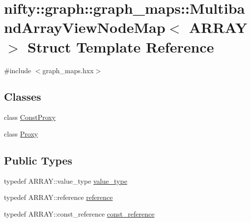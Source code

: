 \hypertarget{structnifty_1_1graph_1_1graph__maps_1_1MultibandArrayViewNodeMap}{}\section{nifty\+:\+:graph\+:\+:graph\+\_\+maps\+:\+:Multiband\+Array\+View\+Node\+Map$<$ A\+R\+R\+A\+Y $>$ Struct Template Reference}
\label{structnifty_1_1graph_1_1graph__maps_1_1MultibandArrayViewNodeMap}


{\ttfamily \#include $<$graph\+\_\+maps.\+hxx$>$}

\subsection*{Classes}
\begin{DoxyCompactItemize}
\item 
class \hyperlink{classnifty_1_1graph_1_1graph__maps_1_1MultibandArrayViewNodeMap_1_1ConstProxy}{Const\+Proxy}
\item 
class \hyperlink{classnifty_1_1graph_1_1graph__maps_1_1MultibandArrayViewNodeMap_1_1Proxy}{Proxy}
\end{DoxyCompactItemize}
\subsection*{Public Types}
\begin{DoxyCompactItemize}
\item 
typedef A\+R\+R\+A\+Y\+::value\+\_\+type \hyperlink{structnifty_1_1graph_1_1graph__maps_1_1MultibandArrayViewNodeMap_a1abb884732263c022895486ce3adf8c1}{value\+\_\+type}
\item 
typedef A\+R\+R\+A\+Y\+::reference \hyperlink{structnifty_1_1graph_1_1graph__maps_1_1MultibandArrayViewNodeMap_ae8a745152ddc0f45748a17dc130403f6}{reference}
\item 
typedef A\+R\+R\+A\+Y\+::const\+\_\+reference \hyperlink{structnifty_1_1graph_1_1graph__maps_1_1MultibandArrayViewNodeMap_a9a4da5d4bb0e9439af359184b91bc65b}{const\+\_\+reference}
\end{DoxyCompactItemize}

